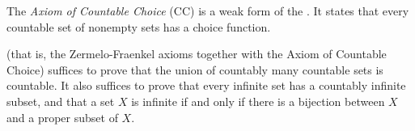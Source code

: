 \documentclass[12pt]{article}
\begin{document}

The \emph{Axiom of Countable Choice} (CC) is a weak form of the .
It states that every countable set of nonempty sets has a choice function.

 (that is, the Zermelo-Fraenkel axioms together with the Axiom of Countable Choice) suffices to prove that the union of countably many countable sets is countable. It also suffices to prove that every infinite set has a countably infinite subset, and that a set $X$ is infinite if and only if there is a bijection between $X$ and a proper subset of $X$.
\end{document}
